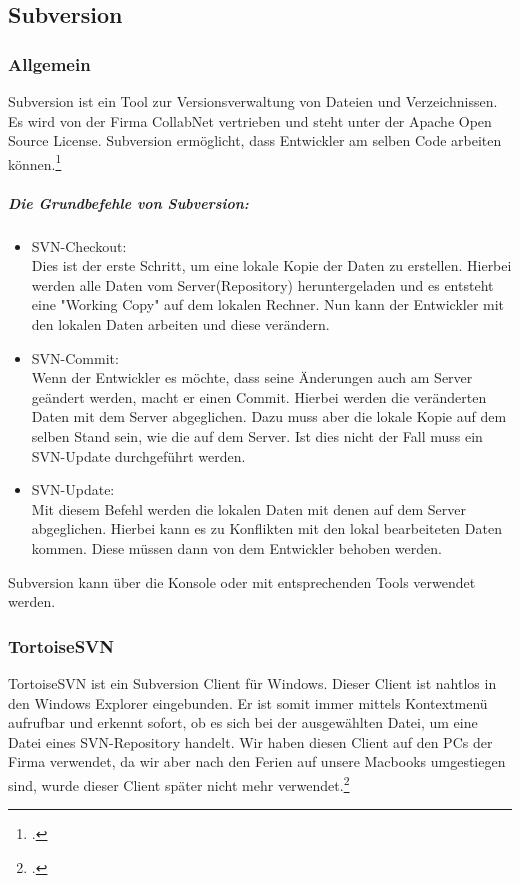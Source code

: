 
\subsection{Subversion}

\subsubsection{Allgemein}
Subversion ist ein Tool zur Versionsverwaltung von Dateien und Verzeichnissen. Es wird von der Firma CollabNet vertrieben und steht unter der Apache Open Source License. Subversion ermöglicht, dass Entwickler am selben Code arbeiten können.\footcite[vgl.][]{subversion} 

\subparagraph{Die Grundbefehle von Subversion:}
\begin{itemize}
\item SVN-Checkout:\\
Dies ist der erste Schritt, um eine lokale Kopie der Daten zu erstellen. Hierbei werden alle Daten vom Server(Repository) heruntergeladen und es entsteht eine "Working Copy" auf dem lokalen Rechner. Nun kann der Entwickler mit den lokalen Daten arbeiten und diese verändern.

\item SVN-Commit:\\
Wenn der Entwickler es möchte, dass seine Änderungen auch am Server geändert werden, macht er einen Commit. Hierbei werden die veränderten Daten mit dem Server abgeglichen. Dazu muss aber die lokale Kopie auf dem selben Stand sein, wie die auf dem Server. Ist dies nicht der Fall muss ein SVN-Update durchgeführt werden.

\item SVN-Update:\\
Mit diesem Befehl werden die lokalen Daten mit denen auf dem Server abgeglichen. Hierbei kann es zu Konflikten mit den lokal bearbeiteten Daten kommen. Diese müssen dann von dem Entwickler behoben werden. 
\end{itemize}

Subversion kann über die Konsole oder mit entsprechenden Tools verwendet werden.

\subsubsection{TortoiseSVN}
TortoiseSVN ist ein Subversion Client für Windows. Dieser Client ist nahtlos in den Windows Explorer eingebunden. Er ist somit immer mittels Kontextmenü aufrufbar und erkennt sofort, ob es sich bei der ausgewählten Datei, um eine Datei eines SVN-Repository handelt. Wir haben diesen Client auf den PCs der Firma verwendet, da wir aber nach den Ferien auf unsere Macbooks umgestiegen sind, wurde dieser Client später nicht mehr verwendet.\footcite[vgl.][]{tortoisesvn}


